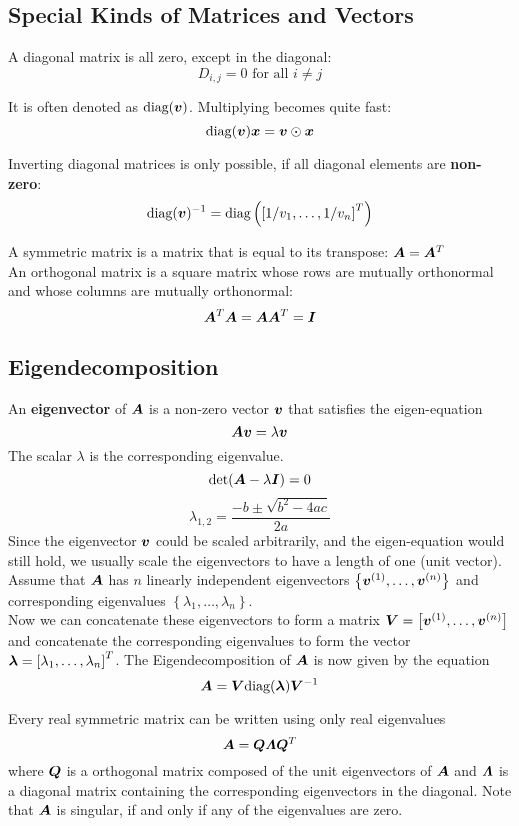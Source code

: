 \begin{multicols}{2}
	\subsection{Special Kinds of Matrices and Vectors}
	A diagonal matrix is all zero, except in the diagonal:
	\[ D_{i,j} = 0 \text{ for all } i\neq j \]
	
	It is often denoted as $\text{diag}(\bol{v})$. Multiplying becomes quite fast:
	\[ \text{diag}(\bol{v})\bol{x} = \bol{v}\odot \bol{x} \]
	
	Inverting diagonal matrices is only possible, if all diagonal elements are \textbf{non-zero}:
	\[ \text{diag}(\bol{v})^{-1} = \text{diag}\left( \left[ 1/v_1,\dots ,1/v_n \right]^T \right) \]
	
	A symmetric matrix is a matrix that is equal to its transpose: $\bol{A} = \bol{A}^T$\\
	
	An orthogonal matrix is a square matrix whose rows are mutually orthonormal and whose columns are mutually orthonormal:
	\[ \bol{A}^T\bol{A} = \bol{A}\bol{A}^T = \bol{I} \]
	
	\subsection{Eigendecomposition}
	An \textbf{eigenvector} of $\bol{A}$ is a non-zero vector $\bol{v}$ that satisfies the eigen-equation
	\[ \bol{A}\bol{v} = \lambda\bol{v} \]
	The scalar $\lambda$ is the corresponding eigenvalue.
	\[ \det(\bolA - \lambda \bol{I}) = 0 \]
	\[ \lambda_{1,2} = \frac{-b \pm \sqrt{b^2-4ac}}{2a} \]
	Since the eigenvector $\bol{v}$ could be scaled arbitrarily, and the eigen-equation would still hold, we usually scale the eigenvectors to have a length of one (unit vector).\\
	
	Assume that $\bol{A}$ has $n$ linearly independent eigenvectors $\left \{ \bolv^{(1)},\dots,\bolv^{(n)}  \right \} $ and corresponding eigenvalues $ \left \{ \lambda_1,\dots,\lambda_n \right \} $.\\
	Now we can concatenate these eigenvectors to form a matrix $\bol{V} = \left[ \bolv^{(1)},\dots,\bolv^{(n)} \right]$ and concatenate the corresponding eigenvalues to form the vector $\bol{\lambda} = \left[ \lambda_1,\dots,\lambda_n \right]^T$.
	The Eigendecomposition of $\bolA$ is now given by the equation
	\[ \bolA = \bol{V}\diag(\bol{\lambda})\bol{V}^{-1} \]
	
	Every real symmetric matrix can be written using only real eigenvalues
	\[ \bolA = \bol{Q}\bol{\Lambda}\bol{Q}^T \]
	where $\bol{Q}$ is a orthogonal matrix composed of the unit eigenvectors of $\bolA$ and $\bol{\Lambda}$ is a diagonal matrix containing the corresponding eigenvectors in the diagonal. Note that $\bolA$ is singular, if and only if any of the eigenvalues are zero.
	

\end{multicols}
